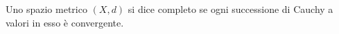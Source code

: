 \begin{definition}
	Uno spazio metrico $(X,d)$ si dice completo se ogni successione di Cauchy a valori in esso è convergente.
\end{definition}





	

